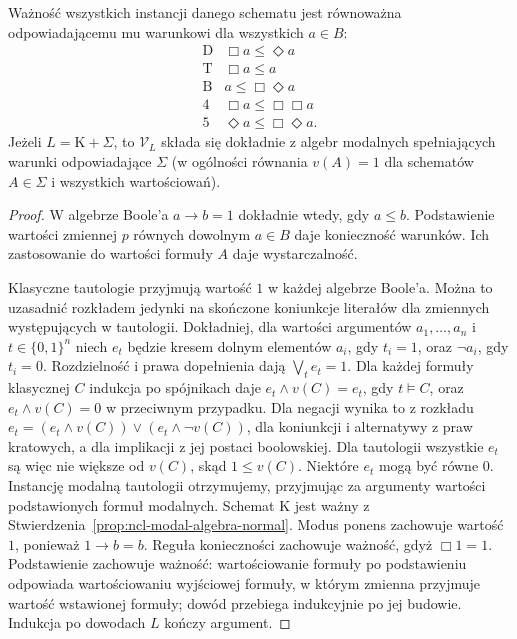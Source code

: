 \begin{stwierdzenie}
\label{prop:ncl-modal-algebra-axioms}
Ważność wszystkich instancji danego schematu
jest równoważna odpowiadającemu mu warunkowi
dla wszystkich $a\in B$:
\[
\begin{array}{c|l}
 \mathrm D&\Box a\leq\Diamond a\\
 \mathrm T&\Box a\leq a\\
 \mathrm B&a\leq\Box\Diamond a\\
 4&\Box a\leq\Box\Box a\\
 5&\Diamond a\leq\Box\Diamond a.
\end{array}
\]
Jeżeli $L=\mathrm K+\Sigma$, to $\mathcal V_L$
składa się dokładnie z algebr modalnych
spełniających warunki odpowiadające $\Sigma$
(w ogólności równania $v(A)=1$ dla schematów
$A\in\Sigma$ i wszystkich wartościowań).
\end{stwierdzenie}
\begin{proof}
W algebrze Boole'a $a\to b=1$ dokładnie wtedy,
gdy $a\leq b$. Podstawienie wartości zmiennej
$p$ równych dowolnym $a\in B$ daje konieczność
warunków. Ich zastosowanie do wartości formuły
$A$ daje wystarczalność.

Klasyczne tautologie przyjmują wartość $1$
w każdej algebrze Boole'a. Można to uzasadnić
rozkładem jedynki na skończone koniunkcje
literałów dla zmiennych występujących w tautologii.
Dokładniej, dla wartości argumentów $a_1,\ldots,a_n$
i $t\in\{0,1\}^n$ niech $e_t$ będzie kresem dolnym
elementów $a_i$, gdy $t_i=1$, oraz $\neg a_i$,
gdy $t_i=0$. Rozdzielność i prawa dopełnienia dają
$\bigvee_t e_t=1$. Dla każdej formuły klasycznej
$C$ indukcja po spójnikach daje
$e_t\wedge v(C)=e_t$, gdy $t\models C$, oraz
$e_t\wedge v(C)=0$ w przeciwnym przypadku.
Dla negacji wynika to z rozkładu
$e_t=(e_t\wedge v(C))\vee(e_t\wedge\neg v(C))$,
dla koniunkcji i alternatywy z praw kratowych,
a dla implikacji z jej postaci boolowskiej.
Dla tautologii wszystkie $e_t$ są więc
nie większe od $v(C)$, skąd $1\leq v(C)$.
Niektóre $e_t$ mogą być równe $0$.
Instancję modalną tautologii otrzymujemy,
przyjmując za argumenty wartości podstawionych
formuł modalnych.
Schemat K jest ważny z
Stwierdzenia~\ref{prop:ncl-modal-algebra-normal}.
Modus ponens zachowuje wartość $1$, ponieważ
$1\to b=b$. Reguła konieczności zachowuje
ważność, gdyż $\Box1=1$.
Podstawienie zachowuje ważność: wartościowanie
formuły po podstawieniu odpowiada wartościowaniu
wyjściowej formuły, w którym zmienna przyjmuje
wartość wstawionej formuły; dowód przebiega
indukcyjnie po jej budowie.
Indukcja po dowodach $L$ kończy argument.
\end{proof}

